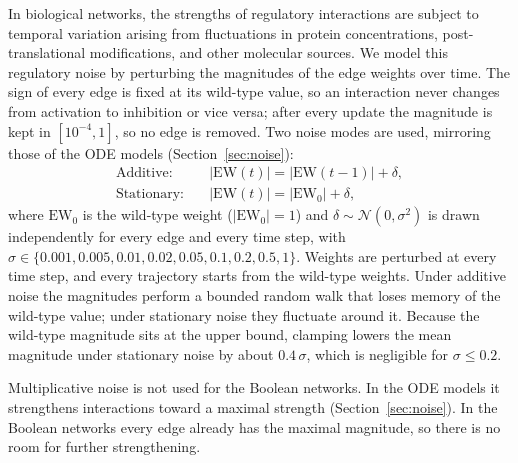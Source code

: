 \documentclass[11pt]{article}
\begin{document}
In biological networks, the strengths of regulatory interactions are subject to temporal variation arising from fluctuations in protein concentrations, post-translational modifications, and other molecular sources. We model this regulatory noise by perturbing the magnitudes of the edge weights over time. The sign of every edge is fixed at its wild-type value, so an interaction never changes from activation to inhibition or vice versa; after every update the magnitude is kept in $[10^{-4}, 1]$, so no edge is removed. Two noise modes are used, mirroring those of the ODE models (Section~\ref{sec:noise}):
\begin{align}
\text{Additive:} \quad & |\mathrm{EW}(t)| = |\mathrm{EW}(t-1)| + \delta,\\
\text{Stationary:} \quad & |\mathrm{EW}(t)| = |\mathrm{EW}_0| + \delta,
\end{align}
where $\mathrm{EW}_0$ is the wild-type weight ($|\mathrm{EW}_0| = 1$) and $\delta \sim \mathcal{N}(0, \sigma^2)$ is drawn independently for every edge and every time step, with $\sigma \in \{0.001, 0.005, 0.01, 0.02, 0.05, 0.1, 0.2, 0.5, 1\}$. Weights are perturbed at every time step, and every trajectory starts from the wild-type weights. Under additive noise the magnitudes perform a bounded random walk that loses memory of the wild-type value; under stationary noise they fluctuate around it. Because the wild-type magnitude sits at the upper bound, clamping lowers the mean magnitude under stationary noise by about $0.4\,\sigma$, which is negligible for $\sigma \le 0.2$.

Multiplicative noise is not used for the Boolean networks. In the ODE models it strengthens interactions toward a maximal strength (Section~\ref{sec:noise}). In the Boolean networks every edge already has the maximal magnitude, so there is no room for further strengthening.
\end{document}
